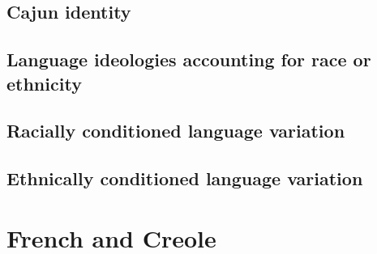     \subsection{Cajun identity}
    \subsection{Language ideologies accounting for race or ethnicity}
    \subsection{Racially conditioned language variation}
    \subsection{Ethnically conditioned language variation}
  \section{French and Creole}
